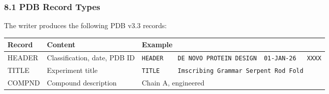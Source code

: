 \documentclass[12pt,a4paper]{article}
\begin{document}
\hypertarget{pdb-record-types}{%
\subsubsection{8.1 PDB Record Types}\label{pdb-record-types}}

The writer produces the following PDB v3.3 records:

\begin{longtable}[]{@{}lll@{}}
\toprule
\begin{minipage}[b]{0.28\columnwidth}\raggedright
Record\strut
\end{minipage} & \begin{minipage}[b]{0.32\columnwidth}\raggedright
Content\strut
\end{minipage} & \begin{minipage}[b]{0.32\columnwidth}\raggedright
Example\strut
\end{minipage}\tabularnewline
\midrule
\endhead
\begin{minipage}[t]{0.28\columnwidth}\raggedright
HEADER\strut
\end{minipage} & \begin{minipage}[t]{0.32\columnwidth}\raggedright
Classification, date, PDB ID\strut
\end{minipage} & \begin{minipage}[t]{0.32\columnwidth}\raggedright
\texttt{HEADER\ \ \ \ DE\ NOVO\ PROTEIN\ DESIGN\ \ 01-JAN-26\ \ \ XXXX}\strut
\end{minipage}\tabularnewline
\begin{minipage}[t]{0.28\columnwidth}\raggedright
TITLE\strut
\end{minipage} & \begin{minipage}[t]{0.32\columnwidth}\raggedright
Experiment title\strut
\end{minipage} & \begin{minipage}[t]{0.32\columnwidth}\raggedright
\texttt{TITLE\ \ \ \ \ Imscribing\ Grammar\ Serpent\ Rod\ Fold}\strut
\end{minipage}\tabularnewline
\begin{minipage}[t]{0.28\columnwidth}\raggedright
COMPND\strut
\end{minipage} & \begin{minipage}[t]{0.32\columnwidth}\raggedright
Compound description\strut
\end{minipage} & \begin{minipage}[t]{0.32\columnwidth}\raggedright
Chain A, engineered\strut
\end{minipage}\tabularnewline

\end{longtable}
\end{document}
